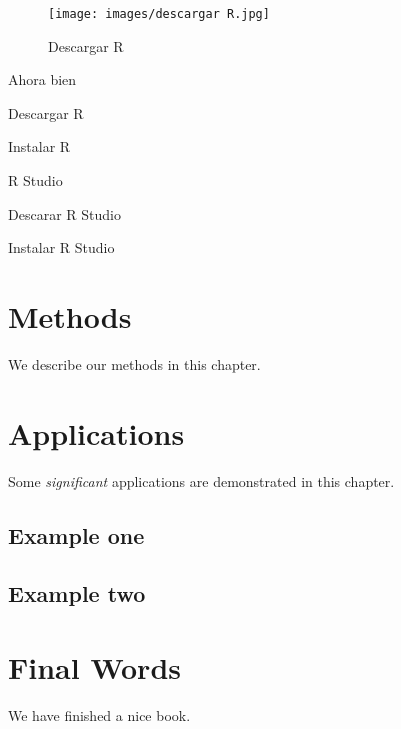 \documentclass[
]{book}
\begin{document}
\begin{figure}
\centering
\texttt{[image: images/descargar R.jpg]}
\caption{Descargar R \citep{r.fundation2021}}
\end{figure}

Ahora bien

Descargar R

Instalar R

R Studio

Descarar R Studio

Instalar R Studio

\hypertarget{methods}{%
\chapter{Methods}\label{methods}}

We describe our methods in this chapter.

\hypertarget{applications}{%
\chapter{Applications}\label{applications}}

Some \emph{significant} applications are demonstrated in this chapter.

\hypertarget{example-one}{%
\section{Example one}\label{example-one}}

\hypertarget{example-two}{%
\section{Example two}\label{example-two}}

\hypertarget{final-words}{%
\chapter{Final Words}\label{final-words}}

We have finished a nice book.

  
\end{document}
